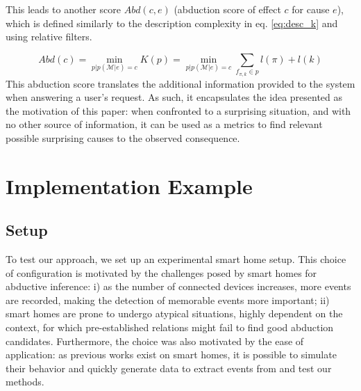 \documentclass[conference]{IEEEtran}
\begin{document}
This leads to another score $Abd(c,e)$ (abduction score of effect $c$ for cause
$e$), which is defined similarly to the description complexity in eq.
\ref{eq:desc_k} and using relative filters.

\begin{equation}
  \label{eq:abd_k}
  Abd(c) = \min_{p | p(\mathcal{M}|e) = c} K(p) = \min_{p | p(\mathcal{M}|e)=c} \sum_{f_{\pi, k} \in p} l(\pi) + l(k)
\end{equation}
This abduction score translates the additional information provided to the
system when answering a user's request. As such, it encapsulates the idea
presented as the motivation of this paper: when confronted to a surprising
situation, and with no other source of information, it can be used as a metrics
to find relevant possible surprising causes to the observed consequence.

\section{Implementation Example}
\label{sec:example}
\subsection{Setup}
To test our approach, we set up an experimental smart home setup. This choice of
configuration is motivated by the challenges posed by smart homes for abductive
inference: i) as the number of connected devices increases, more events are
recorded, making the detection of memorable events more important; ii) smart
homes are prone to undergo atypical situations, highly dependent on the context,
for which pre-established relations might fail to find good abduction
candidates. Furthermore, the choice was also motivated by the ease of application: as
previous works exist on smart homes, it is possible to simulate their behavior
and quickly generate data to extract events from and test our methods.


\end{document}
